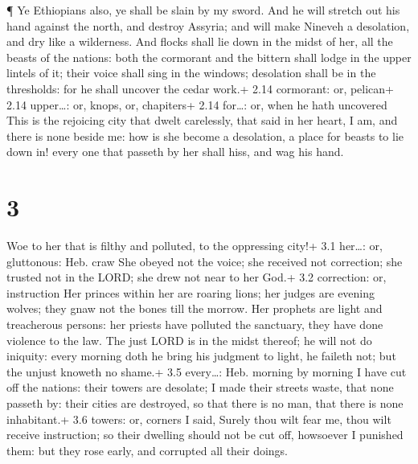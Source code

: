  ¶ Ye Ethiopians also, ye shall be slain by my sword.
 And he will stretch out his hand against the north, and
destroy Assyria; and will make Nineveh a desolation, and dry like a
wilderness.  And flocks shall lie down in the midst of her,
all the beasts of the nations: both the cormorant and the bittern shall
lodge in the upper lintels of it; their voice shall sing in the windows;
desolation shall be in the thresholds: for he shall uncover the cedar
work.+ 2.14 cormorant: or, pelican+ 2.14 upper\ldots: or, knops, or,
chapiters+ 2.14 for\ldots: or, when he hath uncovered  This
is the rejoicing city that dwelt carelessly, that said in her heart, I
am, and there is none beside me: how is she become a desolation, a place
for beasts to lie down in! every one that passeth by her shall hiss, and
wag his hand.

\hypertarget{section-2}{%
\section{3}\label{section-2}}

 Woe to her that is filthy and polluted, to the oppressing
city!+ 3.1 her\ldots: or, gluttonous: Heb. craw  She obeyed
not the voice; she received not correction; she trusted not in the LORD;
she drew not near to her God.+ 3.2 correction: or, instruction
 Her princes within her are roaring lions; her judges are
evening wolves; they gnaw not the bones till the morrow. 
Her prophets are light and treacherous persons: her priests have
polluted the sanctuary, they have done violence to the law. 
The just LORD is in the midst thereof; he will not do iniquity: every
morning doth he bring his judgment to light, he faileth not; but the
unjust knoweth no shame.+ 3.5 every\ldots: Heb. morning by morning
 I have cut off the nations: their towers are desolate; I
made their streets waste, that none passeth by: their cities are
destroyed, so that there is no man, that there is none inhabitant.+ 3.6
towers: or, corners  I said, Surely thou wilt fear me, thou
wilt receive instruction; so their dwelling should not be cut off,
howsoever I punished them: but they rose early, and corrupted all their
doings.

